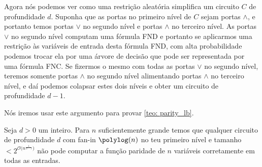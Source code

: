 Agora nós podemos ver como uma restrição aleatória simplifica um circuito $C$ de profundidade $d$. Suponha que as portas no primeiro nível de $C$ sejam portas $\land$, e portanto temos portas $\lor$ no segundo nível e portas $\land$ no terceiro nível. As portas $\lor$ no segundo nível computam uma fórmula FND e portanto se aplicarmos uma restrição às variáveis de entrada desta fórmula FND, com alta probabilidade podemos trocar ela por uma árvore de decisão que pode ser representada por uma fórmula FNC. Se fizermos o mesmo com todas as portas $\lor$ no segundo nível, teremos somente portas $\land$ no segundo nível alimentando portas $\land$ no terceiro nível, e daí podemos colapsar estes dois níveis e obter um circuito de profundidade $d - 1$.

Nós iremos usar este argumento para provar \ref{teo: parity_lb}.

\begin{teo}

Seja $d > 0$ um inteiro. Para $n$ suficientemente grande temos que qualquer circuito de profundidade $d$ com fan-in $\polylog(n)$ no teu primeiro nível e tamanho $< 2^{\mathcal{O}\big(n^{\frac{1}{d - 1}}\big)}$ não pode computar a função paridade de $n$ variáveis corretamente em todas as entradas. 

\end{teo}


